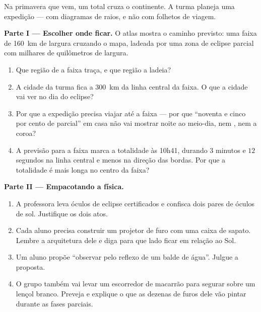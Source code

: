 \begin{problem}\label{pb:g7:shadows-eclipses:1}
Na primavera que vem, um  total cruza o continente. A
turma planeja uma expedição --- com diagramas de raios, e não com
folhetos de viagem.

\medskip\noindent\textbf{Parte I --- Escolher onde ficar.}
O atlas mostra o caminho previsto: uma faixa de \qty{160}{km} de
largura cruzando o mapa, ladeada por uma zona de eclipse parcial com
milhares de quilômetros de largura.
\begin{enumerate}
  \item Que região de  a faixa traça, e que região a ladeia?
  \item A cidade da turma fica a \qty{300}{km} da linha central da
        faixa. O que a cidade vai ver no dia do eclipse?
  \item Por que a expedição precisa viajar até a faixa --- por que
        ``noventa e cinco por cento de parcial'' em casa não vai
        mostrar noite ao meio-dia, nem , nem a coroa?
  \item A previsão para a faixa marca a totalidade às 10h41,
        durando $3$ minutos e $12$ segundos na linha central e menos
        na direção das bordas. Por que a totalidade é mais longa no
        centro da faixa?
\end{enumerate}

\medskip\noindent\textbf{Parte II --- Empacotando a física.}
\begin{enumerate}[resume]
  \item A professora leva óculos de eclipse certificados e confisca
        dois pares de óculos de sol. Justifique os dois atos.
  \item Cada aluno precisa construir um projetor de furo com uma
        caixa de sapato. Lembre a arquitetura dele e diga para que
        lado ficar em relação ao Sol.
  \item Um aluno propõe ``observar pelo reflexo de um balde de
        água''. Julgue a proposta.
  \item O grupo também vai levar um escorredor de macarrão para
        segurar sobre um lençol branco. Preveja e explique o que as
        dezenas de furos dele vão pintar durante as fases parciais.
\end{enumerate}


\end{problem}
